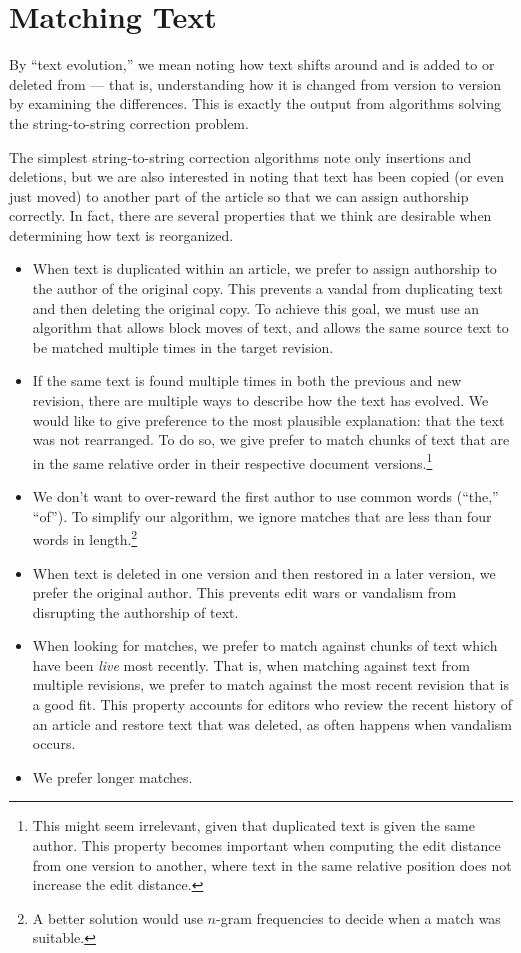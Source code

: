 \section{Matching Text}

By ``text evolution,'' we mean noting how text shifts
around and is added to or deleted from --- that is,
understanding how it is changed from version to version
by examining the differences.
This is exactly the output from algorithms solving the
string-to-string correction problem.

The simplest string-to-string correction algorithms
note only insertions and deletions, but we are also interested
in noting that text has been copied (or even just moved)
to another part of the article so that we can assign authorship
correctly.
In fact, there are several properties that we think are desirable
when determining how text is reorganized.
\begin{itemize}
\item When text is duplicated within an article, we prefer to assign
    authorship to the author of the original copy.
    This prevents a vandal from duplicating text and then deleting the
    original copy.
    To achieve this goal, we must use an algorithm that allows
    block moves of text, and allows the same source text to be
    matched multiple times in the target revision.
\item If the same text is found multiple times in both the previous
    and new revision, there are multiple ways to describe how the
    text has evolved.
    We would like to give preference to the most plausible explanation:
    that the text was not rearranged.
    To do so, we give prefer to match chunks of text that are in the
    same relative order in their respective document
    versions.\footnote{This might seem irrelevant, given that duplicated
    text is given the same author.  This property becomes important
    when computing the edit distance from one version to another,
    where text in the same relative position does not increase the
    edit distance.}
\item We don't want to over-reward the first author to use common
    words (\eg ``the,'' ``of'').
    To simplify our algorithm, we ignore matches that are less than
    four words in length.\footnote{A better solution would use
    $n$-gram frequencies to decide when a match was suitable.}
\item When text is deleted in one version and then restored in a later
    version, we prefer the original author.
    This prevents edit wars or vandalism from disrupting the
    authorship of text.
\item When looking for matches, we prefer to match against chunks
    of text which have been \textit{live} most recently.
    That is, when matching against text from multiple revisions,
    we prefer to match against the most recent revision that is
    a good fit.
    This property accounts for editors who review the recent history
    of an article and restore text that was deleted, as often happens
    when vandalism occurs.
\item We prefer longer matches.
\end{itemize}


